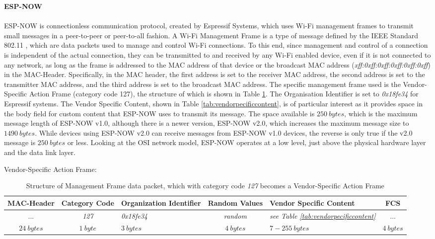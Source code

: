 \textbf{ESP-NOW}\\\\
ESP-NOW is connectionless communication protocol, created by Espressif Systems, which uses Wi-Fi management frames to transmit small messages in a peer-to-peer or peer-to-all fashion. A Wi-Fi Management Frame is a type of message defined by the IEEE Standard 802.11 \citep{noauthor_ieee_2024-1}, which are data packets used to manage and control Wi-Fi connections. To this end, since management and control of a connection is independent of the actual connection, they can be transmitted to and received by any Wi-Fi enabled device, even if it is not connected to any network, as long as the frame is addressed to the MAC address of that device or the broadcast MAC address (\textit{xff:0xff:0xff:0xff:0xff:0xff}) in the MAC-Header. Specifically, in the MAC header, the first address is set to the receiver MAC address, the second address is set to the transmitter MAC address, and the third address is set to the broadcast MAC address. The specific management frame used is the Vendor-Specific Action Frame (category code 127), the structure of which is shown in Table \ref{tab:managementframe}. The Organisation Identifier is set to \textit{0x18fe34} for Espressif systems. The Vendor Specific Content, shown in Table \ref{tab:vendorpecificcontent}, is of particular interest as it provides space in the body field for custom content that ESP-NOW uses to transmit its message. The space available is $250\ bytes$, which is the maximum message length of ESP-NOW v1.0, although there is a newer version, ESP-NOW v2.0, which increases the maximum message size to $1490\ bytes$. While devices using ESP-NOW v2.0 can receive messages from ESP-NOW v1.0 devices, the reverse is only true if the v2.0 message is $250\ bytes$ or less. Looking at the OSI network model, ESP-NOW operates at a low level, just above the physical hardware layer and the data link layer.

\begin{table}[H]
    \centering
    Vendor-Specific Action Frame:
    \begin{tabular}{|c|c|p{70pt}|c|p{70pt}|c|}
        \hline
        \textbf{MAC-Header} & \textbf{Category Code} & \textbf{Organization Identifier} & \textbf{Random Values} & \textbf{Vendor Specific Content} & \textbf{FCS} \\
        \hline\hline
        ... & \textit{127} & \textit{0x18fe34} & \textit{random} & \textit{see Table \ref{tab:vendorpecificcontent}} & ... \\
        \hline\hline
        $24\ bytes$ & $1\ byte$ & $3\ bytes$ & $4\ bytes$ & $7-255\ bytes$ & $4\ bytes$ \\
        \hline
    \end{tabular}
    \vspace{\ftspace}
    \caption{Structure of Management Frame data packet, which with category code \textit{127} becomes a Vendor-Specific Action Frame \citep[adapted from][]{espressif_systems_esp-now_nodate}}
    \label{tab:managementframe}
\end{table}

